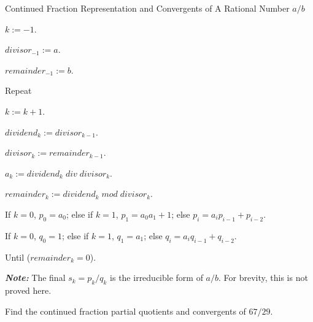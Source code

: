\begin{vworkalgorithmstatementpar}{Continued Fraction Representation and
                                   Convergents of 
                                   A Rational Number \mbox{\boldmath $a/b$}}
\label{alg:crla1:slcr0:scfr0:akgenalg}
\begin{alglvl0}
\item $k:=-1$.
\item $divisor_{-1} := a$.
\item $remainder_{-1} := b$.

\item Repeat

\begin{alglvl1}
\item $k := k + 1$.
\item $dividend_k := divisor_{k-1}$.
\item $divisor_k  := remainder_{k-1}$.
\item $a_k :=  dividend_k \; div \; divisor_k$.
\item $remainder_k := dividend_k \; mod \; divisor_k$.
\item If $k=0$, $p_0 = a_0$; else if $k=1$, $p_1 = a_0 a_1 + 1$; 
      else $p_i = a_i p_{i-1} + p_{i-2}$.
\item If $k=0$, $q_0 = 1$; else if $k=1$, $q_1 = a_1$; 
      else $q_i = a_i q_{i-1} + q_{i-2}$.
\end{alglvl1}

\item Until ($remainder_k = 0$).
\end{alglvl0}
\textbf{\emph{Note:}} The final $s_k = p_k / q_k$ is the irreducible
form of $a/b$.  For brevity, this is not proved here.
\end{vworkalgorithmstatementpar}
\begin{vworkexamplestatement}
\label{ex:crla1:slcr0:scfr0:01}
Find the continued fraction partial quotients and convergents of 
$67/29$.
\end{vworkexamplestatement}
